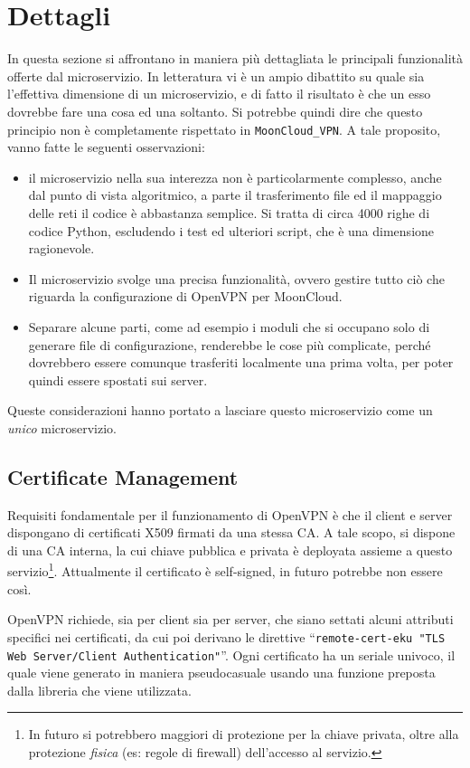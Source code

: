 \section{Dettagli}
In questa sezione si affrontano in maniera più dettagliata le principali funzionalità
offerte dal microservizio. In letteratura vi è un ampio dibattito su quale sia
l'effettiva dimensione di un microservizio, e di fatto il risultato è che un esso
dovrebbe fare una cosa ed una soltanto. Si potrebbe quindi dire che questo principio
non è completamente rispettato in \texttt{MoonCloud\_VPN}. A tale proposito, vanno fatte
le seguenti osservazioni:
\begin{itemize}
    \item il microservizio nella sua interezza non è particolarmente complesso, anche
    dal punto di vista algoritmico, a parte il trasferimento file ed il mappaggio
    delle reti il codice è abbastanza semplice. 
    Si tratta di circa 4000 righe di codice Python, escludendo i test ed ulteriori script,
    che è una dimensione ragionevole.
    \item Il microservizio svolge una precisa funzionalità, ovvero gestire tutto ciò
    che riguarda la configurazione di OpenVPN  per MoonCloud.
    \item Separare alcune parti, come ad esempio i moduli che si occupano solo di generare
    file di configurazione, renderebbe le cose più complicate, perché dovrebbero essere
    comunque trasferiti localmente una prima volta, per poter quindi essere spostati
    sui server. 
\end{itemize}
Queste considerazioni hanno portato a lasciare questo microservizio come un \textit{unico}
microservizio.

\subsection{Certificate Management}
Requisiti fondamentale per il funzionamento di OpenVPN è che il client e server dispongano
di certificati X509 firmati da una stessa CA.
A tale scopo, si dispone di una CA interna, la cui chiave pubblica e privata è deployata
assieme a questo servizio\footnote{In futuro si potrebbero maggiori di protezione per la
	chiave privata, oltre alla protezione \textit{fisica} (es: regole di firewall) dell'accesso
al servizio.}. Attualmente il certificato è self-signed, in futuro potrebbe non essere così.

OpenVPN richiede, sia per client sia per server, che siano settati alcuni attributi
specifici nei certificati, da cui poi derivano le direttive
``\texttt{remote-cert-eku "TLS Web Server/Client
Authentication"}''. Ogni certificato ha un seriale univoco, il quale viene generato
in maniera pseudocasuale usando una funzione preposta dalla libreria che viene
utilizzata.

